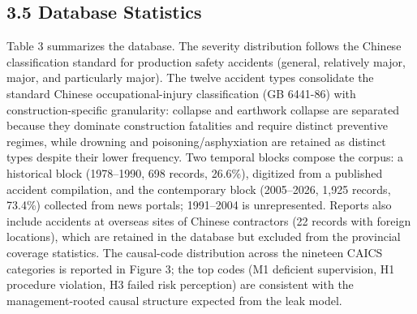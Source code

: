 \documentclass[11pt]{article}
\begin{document}
\subsection{3.5 Database Statistics}
Table 3 summarizes the database. The severity distribution follows the Chinese classification standard for production safety accidents (general, relatively major, major, and particularly major). The twelve accident types consolidate the standard Chinese occupational-injury classification (GB 6441-86) with construction-specific granularity: collapse and earthwork collapse are separated because they dominate construction fatalities and require distinct preventive regimes, while drowning and poisoning/asphyxiation are retained as distinct types despite their lower frequency. Two temporal blocks compose the corpus: a historical block (1978--1990, 698 records, 26.6\%), digitized from a published accident compilation, and the contemporary block (2005--2026, 1,925 records, 73.4\%) collected from news portals; 1991--2004 is unrepresented. Reports also include accidents at overseas sites of Chinese contractors (22 records with foreign locations), which are retained in the database but excluded from the provincial coverage statistics. The causal-code distribution across the nineteen CAICS categories is reported in Figure 3; the top codes (M1 deficient supervision, H1 procedure violation, H3 failed risk perception) are consistent with the management-rooted causal structure expected from the leak model.
\end{document}
